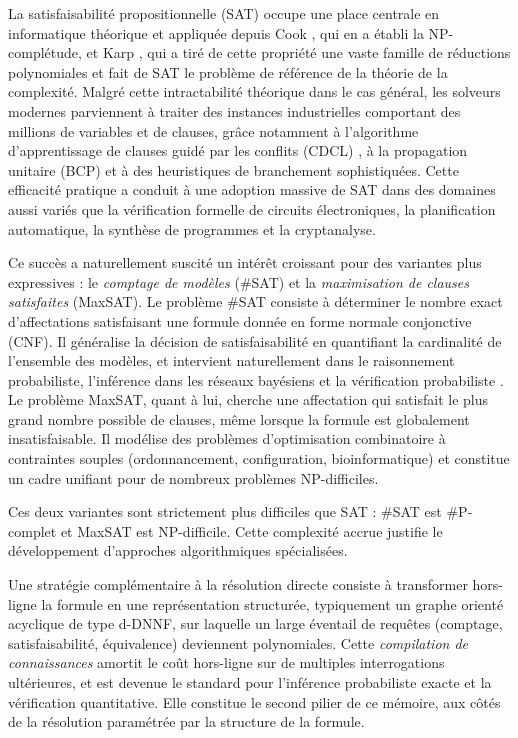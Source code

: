 \documentclass[11pt,a4paper]{report}
\theoremstyle{plain}
\theoremstyle{definition}
\begin{document}
La satisfaisabilité propositionnelle (SAT) occupe une place centrale en informatique
théorique et appliquée depuis Cook \cite{cook1971}, qui en a établi la
NP-complétude, et Karp \cite{karp1972}, qui a tiré de cette propriété une vaste
famille de réductions polynomiales et fait de SAT le problème de référence de la
théorie de la complexité. Malgré cette intractabilité théorique dans le cas général, les
solveurs modernes parviennent à traiter des instances industrielles comportant des
millions de variables et de clauses, grâce notamment à l'algorithme d'apprentissage
de clauses guidé par les conflits (CDCL) \cite{marques1999,een2003}, à la propagation
unitaire (BCP) et à des heuristiques de branchement sophistiquées. Cette efficacité
pratique a conduit à une adoption massive de SAT dans des domaines aussi variés que
la vérification formelle de circuits électroniques, la planification automatique, la
synthèse de programmes et la cryptanalyse.

Ce succès a naturellement suscité un intérêt croissant pour des variantes plus
expressives : le \emph{comptage de modèles} (\#SAT) et la \emph{maximisation de
clauses satisfaites} (MaxSAT). Le problème \#SAT consiste à déterminer le nombre
exact d'affectations satisfaisant une formule donnée en forme normale
conjonctive (CNF). Il généralise la
décision de satisfaisabilité en quantifiant la cardinalité de l'ensemble des
modèles, et intervient naturellement dans le raisonnement probabiliste,
l'inférence dans les réseaux bayésiens et la vérification probabiliste
\cite{darwiche2002}. Le problème MaxSAT, quant à lui, cherche une affectation
qui satisfait le plus grand nombre possible de clauses, même lorsque la formule
est globalement insatisfaisable. Il modélise des problèmes d'optimisation
combinatoire à contraintes souples (ordonnancement, configuration, bioinformatique)
et constitue un cadre unifiant pour de nombreux problèmes NP-difficiles.

Ces deux variantes sont strictement plus difficiles que SAT : \#SAT est
\#P-complet \cite{valiant1979} et MaxSAT est NP-difficile. Cette complexité
accrue justifie le développement d'approches algorithmiques spécialisées.

Une stratégie complémentaire à la résolution directe consiste à transformer
hors-ligne la formule en une représentation structurée, typiquement un graphe
orienté acyclique de type d-DNNF, sur laquelle un large éventail de requêtes
(comptage, satisfaisabilité, équivalence) deviennent polynomiales. Cette
\emph{compilation de connaissances} \cite{darwiche2002} amortit le coût
hors-ligne sur de multiples interrogations ultérieures, et est devenue le
standard pour l'inférence probabiliste exacte et la vérification quantitative.
Elle constitue le second pilier de ce mémoire, aux côtés de la résolution
paramétrée par la structure de la formule.
\end{document}

